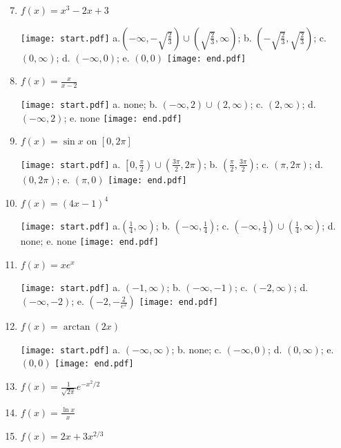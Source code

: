 \documentclass[12pt]{article}
\begin{document}
\begin{enumerate}
\setcounter{enumi}{6}

\item $f(x) = x^3-2x+3$ 

\texttt{[image: start.pdf]}
{{a.$\left(-\infty, -\sqrt{\frac{2}{3}}\right)\cup \left(\sqrt{\frac{2}{3}}, \infty \right)$; b. $\left(-\sqrt{\frac{2}{3}},\sqrt{\frac{2}{3}}\right)$; c. $(0,\infty)$; d. $(-\infty,0)$; e. $(0,0)$}}
\texttt{[image: end.pdf]}


\item $f(x) = \frac{x}{x-2}$ 

\texttt{[image: start.pdf]}
{{a. none; b. $(-\infty,2) \cup (2,\infty)$; c. $(2,\infty)$; d. $(-\infty, 2)$; e. none}}
\texttt{[image: end.pdf]}


\item $f(x) = \sin{x} \text{ on } [0,2\pi]$ 

\texttt{[image: start.pdf]}
{{a. $\left[0, \frac{\pi}{2}\right)\cup \left(\frac{3\pi}{2},2\pi \right)$; b. $ \left(\frac{\pi}{2}, \frac{3\pi}{2} \right)$; c. $(\pi, 2\pi)$; d. $(0,2\pi)$; e. $(\pi,0)$}}
\texttt{[image: end.pdf]}


\item $f(x) = (4x-1)^4$ 

\texttt{[image: start.pdf]}
{{a.$\left(\frac{1}{4},\infty \right)$; b. $\left(-\infty, \frac{1}{4}\right)$; c. $\left(-\infty,\frac{1}{4}\right) \cup \left(\frac{1}{4},\infty \right)$; d. none; e. none}}
\texttt{[image: end.pdf]}


\item $f(x) = xe^x$ 

\texttt{[image: start.pdf]}
{{a. $(-1, \infty)$; b. $(-\infty, -1)$; c. $(-2,\infty)$; d. $(-\infty, -2)$; e. $\left(-2,-\frac{2}{e^2}\right)$}}
\texttt{[image: end.pdf]}


\item $f(x) = \arctan{(2x)}$ 

\texttt{[image: start.pdf]}
{{a. $(-\infty,\infty)$; b. none; c. $(-\infty,0)$; d. $(0,\infty)$; e. $(0,0)$}}
\texttt{[image: end.pdf]}


\item $f(x)=\frac{1}{\sqrt{2\pi}}e^{-x^2/2}$

\item $f(x)=\frac{\ln{x}}{x}$

\item $f(x)=2x+3x^{2/3}$

\end{enumerate}
\end{document}
